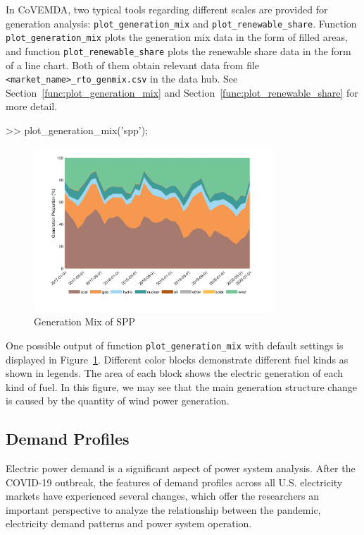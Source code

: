 \documentclass[10pt]{article}
\newcommand{\covemda}{CoVEMDA}
\numberwithin{equation}{section}
\numberwithin{table}{section}
\numberwithin{figure}{section}
\begin{document}
In \covemda{}, two typical tools regarding different scales are provided for generation analysis: \verb!plot_generation_mix! and \verb!plot_renewable_share!. Function \verb!plot_generation_mix! plots the generation mix data in the form of filled areas, and function \verb!plot_renewable_share! plots the renewable share data in the form of a line chart. Both of them obtain relevant data from file \verb!<market_name>_rto_genmix.csv! in the data hub. See Section~\ref{func:plot_generation_mix} and Section~\ref{func:plot_renewable_share} for more detail.

\begin{Command}
>> plot_generation_mix('spp');
\end{Command}

\begin{figure}[ht]
  \centering
  \noindent\includegraphics[width=0.8\textwidth]{figures/visualization_plot_generation_mix.jpg}
  \caption{Generation Mix of SPP} \label{fig:vis_1}
\end{figure}

One possible output of function \verb!plot_generation_mix! with default settings is displayed in Figure~\ref{fig:vis_1}. Different color blocks demonstrate different fuel kinds as shown in legends. The area of each block shows the electric generation of each kind of fuel. In this figure, we may see that the main generation structure change is caused by the quantity of wind power generation.



\subsection{Demand Profiles}

Electric power demand is a significant aspect of power system analysis. After the COVID-19 outbreak, the features of demand profiles across all U.S. electricity markets have experienced several changes, which offer the researchers an important perspective to analyze the relationship between the pandemic, electricity demand patterns and power system operation.
\end{document}
